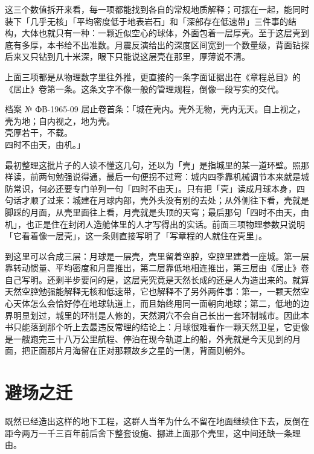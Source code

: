 这三个数值拆开来看，每一项都能找到各自的常规地质解释；可摆在一起，能同时装下「几乎无核」「平均密度低于地表岩石」和「深部存在低速带」三件事的结构，大体也就只有一种：一颗近似空心的球体，外面包着一层厚壳。至于这层壳到底有多厚，本书给不出准数。月震反演给出的深度区间宽到一个数量级，背面钻探后来又只钻到几十米深，眼下只能说这层壳在那里，厚薄说不清。

上面三项都是从物理数字里往外推，更直接的一条字面证据出在《章程总目》的《居止》卷第一条。这条文字不像一般的管理规程，倒像一段写实的交代。

\begin{archive}[内部参考]{档案 № ФВ-1965-09}
居止卷首条：「城在壳内。壳外无物，壳内无天。自上视之，壳为地；自内视之，地为壳。\\
壳厚若干，不载。\\
四时不由天，由机。」
\end{archive}

最初整理这批片子的人读不懂这几句，还以为「壳」是指城里的某一道环壁。照那样读，前两句勉强说得通，最后一句便拐不过弯：城内四季靠机械调节本来就是城防常识，何必还要专门单列一句「四时不由天」。只有把「壳」读成月球本身，四句话才顺了过来：城建在月球内部，壳外头没有别的去处；从外侧往下看，壳就是脚踩的月面，从壳里面往上看，月壳就是头顶的天穹；最后那句「四时不由天，由机」，也正是住在封闭人造舱体里的人才写得出的实话。前面三项物理参数只说明「它看着像一层壳」，这一条则直接写明了「写章程的人就住在壳里」。

到这里可以合成三层：月球是一层壳，壳里留着空腔，空腔里建着一座城。第一层靠转动惯量、平均密度和月震推出，第二层靠低地相连推出，第三层由《居止》卷自己写明。还剩半步要问的是，这层壳究竟是天然长成的还是人为造出来的。就算天然空腔勉强能解释无核和低速带，它也解释不了另外两件事：第一，一颗天然空心天体怎么会恰好停在地球轨道上，而且始终用同一面朝向地球；第二，低地的边界明显划过，城里的环制是人修的，天然洞穴不会自己长出一套环制城市。因此本书只能落到那个听上去最违反常理的结论上：月球很难看作一颗天然卫星，它更像是一艘跑完三十八万公里航程、停泊在现今轨道上的船，外壳就是今天见到的月面，把正面那片月海留在正对那颗故乡之星的一侧，背面则朝外。

\section{避场之迁}

既然已经造出这样的地下工程，这群人当年为什么不留在地面继续住下去，反倒在距今两万一千三百年前后舍下整套设施、挪进上面那个壳里，这中间还缺一条理由。

